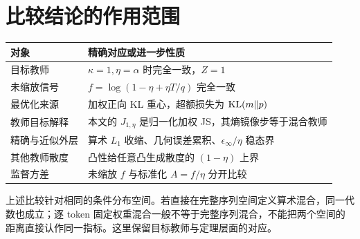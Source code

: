 \section{比较结论的作用范围}
\begin{center}
\small
\begin{tabular}{p{38mm}p{93mm}}
\toprule
对象 & 精确对应或进一步性质\\
\midrule
目标教师 & $\kappa=1,\eta=\alpha$ 时完全一致，$Z=1$\\
未缩放信号 & $f=\log(1-\eta+\eta T/q)$ 完全一致\\
最优化来源 & 加权正向 KL 重心，超额损失为 $\operatorname{KL}(m\Vert p)$\\
教师目标解释 & 本文的 $J_{1,\eta}$ 是归一化加权 JS，其熵镜像步等于混合教师\\
精确与近似外层 & 算术 $L_1$ 收缩、几何误差累积、$\epsilon_\infty/\eta$ 稳态界\\
其他教师散度 & 凸性给任意凸生成散度的 $(1-\eta)$ 上界\\
监督方差 & 未缩放 $f$ 与标准化 $A=f/\eta$ 分开比较\\
\bottomrule
\end{tabular}
\end{center}

上述比较针对相同的条件分布空间。若直接在完整序列空间定义算术混合，同一代数也成立；逐 token 固定权重混合一般不等于完整序列混合，不能把两个空间的距离直接认作同一指标。这里保留目标教师与定理层面的对应。
